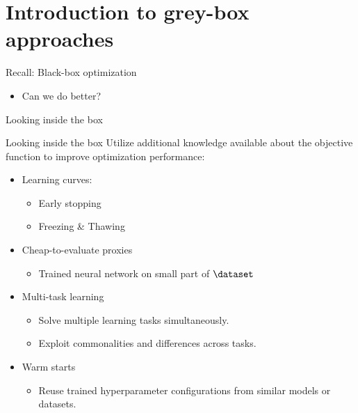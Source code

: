 \section{Introduction to grey-box approaches}
\begin{frame}{Recall: Black-box optimization}
\begin{figure}
    \centering
    
\end{figure}
\pause
\begin{itemize}
    \item Can we do better?
\end{itemize}
    
\end{frame}
\begin{frame}{Looking inside the box}
\begin{figure}
    \centering
    
\end{figure}
\end{frame}
\begin{frame}{Looking inside the box}
Utilize additional knowledge available about the objective function to improve optimization performance:
\begin{itemize}
    \item Learning curves:
    \begin{itemize}
        \item Early stopping
        \item Freezing \& Thawing
    \end{itemize}
    \item Cheap-to-evaluate proxies
    \begin{itemize}
        \item Trained neural network on small part of $\dataset$ 
    \end{itemize}
    \item Multi-task learning
    \begin{itemize}
        \item Solve multiple learning tasks simultaneously.
        \item Exploit commonalities and differences across tasks.
    \end{itemize}
    \item Warm starts
    \begin{itemize}
        \item Reuse trained hyperparameter configurations from similar models or datasets.
    \end{itemize}
\end{itemize}
\end{frame}
